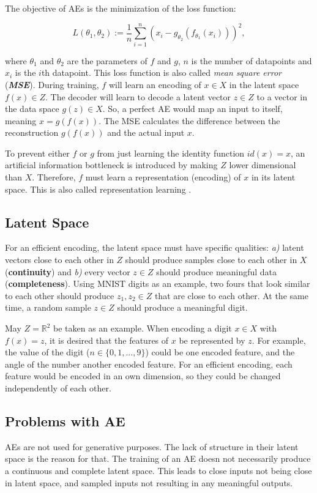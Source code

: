 \documentclass[a4paper]{IEEEtran}
\begin{document}
The objective of AEs is the minimization of the loss function:

\begin{equation}
	L(\theta_1, \theta_2) := \frac{1}{n} \sum_{i = 1}^{n}{(x_i - g_{\theta_2}(f_{\theta_1}(x_i)))^2},
	\label{mse}
\end{equation}

where $\theta_1$ and $\theta_2$ are the parameters of $f$ and $g$, $n$ is the number of datapoints and $x_i$ is the $i$th datapoint. This loss function is also called \textit{mean square error} (\textit{\textbf{MSE}}). During training, $f$ will learn an encoding of $x \in X$ in the latent space $f(x) \in Z$. The decoder will learn to decode a latent vector $z \in Z$ to a vector in the data space $g(z) \in X$. So, a perfect AE would map an input to itself, meaning $x = g(f(x))$. The MSE calculates the difference between the reconstruction $g(f(x))$ and the actual input $x$.

To prevent either $f$ or $g$ from just learning the identity function $id(x) = x$, an artificial information bottleneck is introduced by making $Z$ lower dimensional than $X$. Therefore, $f$ must learn a representation (encoding) of $x$ in its latent space. This is also called representation learning \cite{DBLP:journals/corr/abs-1206-5538}. 

\subsection{Latent Space}
For an efficient encoding, the latent space must have specific qualities: \textit{a)} latent vectors close to each other in $Z$ should produce samples close to each other in $X$ (\textbf{continuity}) and \textit{b)} every vector $z \in Z$ should produce meaningful data (\textbf{completeness}). Using MNIST digits as an example, two fours that look similar to each other should produce $z_1, z_2 \in Z$ that are close to each other. At the same time, a random sample $z \in Z$ should produce a meaningful digit.

May $Z = \mathbb{R}^{2}$ be taken as an example. When encoding a digit $x \in X$ with $f(x) = z$, it is desired that the features of $x$ be represented by $z$. For example, the value of the digit ($n \in \{0,1,...,9\}$) could be one encoded feature, and the angle of the number another encoded feature. For an efficient encoding, each feature would be encoded in an own dimension, so they could be changed independently of each other.

\subsection{Problems with AE}
AEs are not used for generative purposes. The lack of structure in their latent space is the reason for that. The training of an AE doesn not necessarily produce a continuous and complete latent space. This leads to close inputs not being close in latent space, and sampled inputs not resulting in any meaningful outputs.
\end{document}
